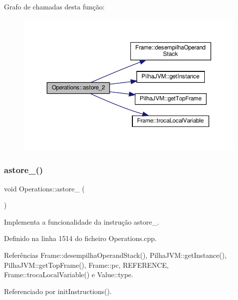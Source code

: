 Grafo de chamadas desta função\+:\nopagebreak
\begin{figure}[H]
\begin{center}
\leavevmode
\includegraphics[width=350pt]{classOperations_a01e238bbea0f9d61d80a8fcd3ed2f660_cgraph}
\end{center}
\end{figure}
\mbox{\label{classOperations_ac3c02b3ff78b6222bd58bebb4f01c083}} 
\subsubsection{\texorpdfstring{astore\+\_()}{astore\_3()}}
{\footnotesize\ttfamily void Operations\+::astore\+\_ (\begin{DoxyParamCaption}{ }\end{DoxyParamCaption})\hspace{0.3cm}{\ttfamily [private]}}



Implementa a funcionalidade da instrução astore\+\_. 



Definido na linha 1514 do ficheiro Operations.\+cpp.



Referências Frame\+::desempilha\+Operand\+Stack(), Pilha\+J\+V\+M\+::get\+Instance(), Pilha\+J\+V\+M\+::get\+Top\+Frame(), Frame\+::pc, R\+E\+F\+E\+R\+E\+N\+CE, Frame\+::troca\+Local\+Variable() e Value\+::type.



Referenciado por init\+Instructions().

